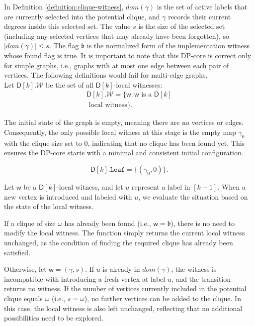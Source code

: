 \documentclass[11pt,a4paper]{article}
\newcommand{\treewidthvalue}{k}
\newcommand{\initialsetgeneric}{\mathtt{Leaf}}
\newcommand{\vertexone}{u}
\newcommand{\allwitnesses}{\mathcal{W}}
\newcommand{\awitness}{\mathsf{w}}
\newcommand{\dpcore}{\mathsf{D}}
\newcommand{\domain}{dom}
\newcommand{\cliqueparameter}{\omega}
\newcommand{\cliquemap}{\gamma}
\newcommand{\cliquesize}{s}
\newcommand{\cliquefound}{\mathfrak{b}}
\begin{document}
{			In Definition \ref{definition:clique-witness}, $\domain(\cliquemap)$ is the set of active labels that are currently selected into the potential clique, and $\cliquemap$ records their current degrees inside this selected set. The value $\cliquesize$ is the size of the selected set (including any selected vertices that may already have been forgotten), so $|\domain(\cliquemap)|\le \cliquesize$. The flag $\cliquefound$ is the normalized form of the implementation witness whose found flag is true. It is important to note that this DP-core is correct only for simple graphs, i.e., graphs with at most one edge between each pair of vertices. The following definitions would fail for multi-edge graphs.
	\\

	 Let $\dpcore[\treewidthvalue].\allwitnesses$ be the set of all $\dpcore[\treewidthvalue]$-local witnesses:
	\begin{multline*}
	\dpcore[\treewidthvalue].\allwitnesses
	= \{\awitness : \awitness \text{ is a } \dpcore[\treewidthvalue]\\
	 \text{ local witness}\}.
	\end{multline*}

	 The initial state of the graph is empty, meaning there are no vertices or edges. Consequently, the only possible local witness at this stage is the empty map $\cliquemap_0$ with the clique size set to $0$, indicating that no clique has been found yet. This ensures the DP-core starts with a minimal and consistent initial configuration.

	\[
	\dpcore[\treewidthvalue].\initialsetgeneric =\{(\cliquemap_0,0)\}.
	\]


	Let $\awitness$ be a $\dpcore[\treewidthvalue]$-local witness, and let $\vertexone$ represent a label in $[\treewidthvalue + 1]$. When a new vertex is introduced and labeled with $\vertexone$, we evaluate the situation based on the state of the local witness.

	If a clique of size \(\cliqueparameter\) has already been found (i.e., \(\awitness = \cliquefound\)), there is no need to modify the local witness. The function simply returns the current local witness unchanged, as the condition of finding the required clique has already been satisfied.

		Otherwise, let $\awitness = (\cliquemap,\cliquesize)$. If $\vertexone$ is already in $\domain(\cliquemap)$, the witness is incompatible with introducing a fresh vertex at label $\vertexone$, and the transition returns no witness. If the number of vertices currently included in the potential clique equals \(\cliqueparameter\) (i.e., \(\cliquesize = \cliqueparameter\)), no further vertices can be added to the clique. In this case, the local witness is also left unchanged, reflecting that no additional possibilities need to be explored.

}
\end{document}
